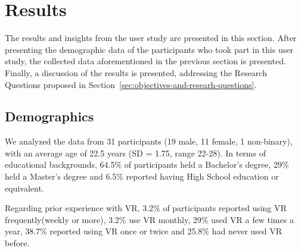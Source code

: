 

\section{Results}
\label{sec:results}

The results and insights from the user study are presented in this section. After presenting the demographic data of the participants who 
took part in this user study, the collected data aforementioned in the previous section is presented. Finally, a discussion of the 
results is presented, addressing the Research Questions proposed in Section~\ref{sec:objectives-and-researh-questions}.

\subsection{Demographics}
\label{sec:demographics}

We analyzed the data from 31 participants (19 male, 11 female, 1 non-binary), with an average age of 22.5 years (SD = 1.75, range 22-28). In terms of educational backgrounds, 64.5\% of participants held a Bachelor's degree, 29\% held a Master’s degree and 6.5\% reported having High School education or equivalent.

Regarding prior experience with \gls{VR}, 3.2\% of participants reported using \gls{VR} frequently(weekly or more), 3.2\% use \gls{VR} monthly, 29\% used \gls{VR} a few times a year, 38.7\% reported using \gls{VR} once or twice and 25.8\% had never used \gls{VR} before.

